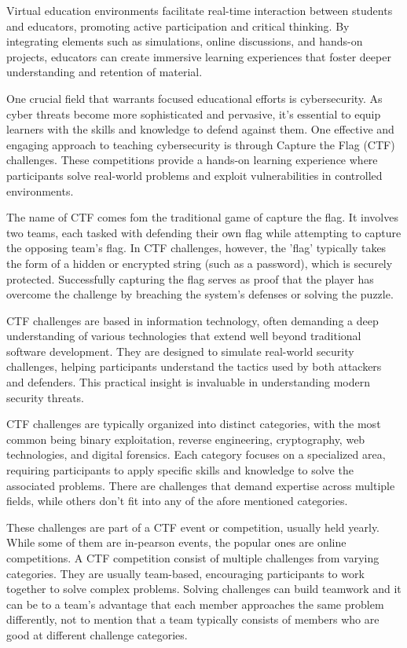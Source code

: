 \documentclass[conference]{IEEEtran}
\begin{document}
Virtual education environments
\cite{gyorok2014}
\cite{safar2019}
\cite{beszedes2023}
facilitate real-time interaction between
students and educators, promoting active participation and critical thinking.
By integrating elements such as simulations, online discussions, and hands-on
projects, educators can create immersive learning experiences that foster
deeper understanding and retention of material.

One crucial field that warrants focused educational efforts is cybersecurity.
As cyber threats become more sophisticated and pervasive, it’s essential to
equip learners with the skills and knowledge to defend against them. One
effective and engaging approach to teaching cybersecurity is through Capture
the Flag (CTF) challenges. These competitions provide a hands-on learning
experience where participants solve real-world problems and exploit
vulnerabilities in controlled environments.
\cite{rahman2020}
\cite{schneider2013}

The name of CTF comes fom the traditional game of capture the flag. It
involves two teams, each tasked with
defending their own flag while attempting to capture the opposing team’s flag.
In CTF challenges, however, the 'flag' typically takes the form of a hidden or
encrypted string (such as a password), which is securely protected.
Successfully capturing the flag serves as proof that the player has overcome
the challenge by breaching the system's defenses or solving the puzzle.

CTF challenges are based in information technology, often demanding a deep
understanding of various technologies that extend well beyond traditional
software development. They are designed to simulate real-world security
challenges, helping participants understand the tactics used by both attackers
and defenders. This practical insight is invaluable in understanding modern
security threats.

CTF challenges are typically organized into distinct categories, with the most
common being binary exploitation, reverse engineering, cryptography, web
technologies, and digital forensics. Each category focuses on a specialized
area, requiring participants to apply specific skills and knowledge to solve
the associated problems. There are challenges that demand expertise across multiple
fields, while others don't fit into any of the afore mentioned categories.

These challenges are part of a CTF event or competition, usually held yearly.
While some of them are in-pearson events, the popular ones are online competitions.
A CTF competition consist of multiple challenges from varying categories. They
are usually team-based, encouraging participants to work together to solve
complex problems. Solving challenges can build teamwork and it can be to a
team's advantage that each member approaches the same problem differently, not
to mention that a team typically consists of members who are good at different
challenge categories.
\end{document}
